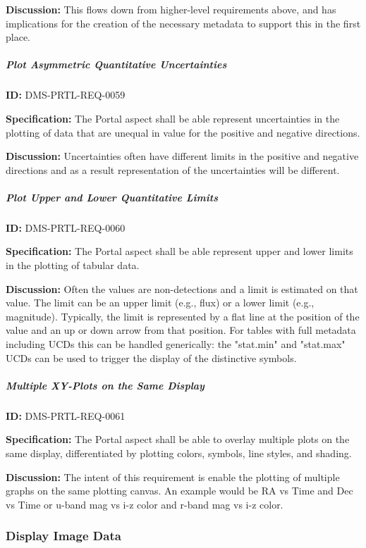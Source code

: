 \documentclass[SE,toc,lsstdraft]{lsstdoc}
\begin{document}
\textbf{Discussion:}
This flows down from higher-level requirements above, and has implications for the creation of the necessary metadata to support this in the first place.

\subparagraph{Plot Asymmetric Quantitative Uncertainties}\hfill  %

\label{DMS-PRTL-REQ-0059}
\textbf{ID:} DMS-PRTL-REQ-0059

\textbf{Specification:}
The Portal aspect shall be able represent uncertainties in the plotting of data that are unequal in value for the positive and negative directions.

\textbf{Discussion:}
Uncertainties often have different limits in the positive and negative directions and as a result representation of the uncertainties will be different.

\subparagraph{Plot Upper and Lower Quantitative Limits}\hfill  %

\label{DMS-PRTL-REQ-0060}
\textbf{ID:} DMS-PRTL-REQ-0060

\textbf{Specification:}
The Portal aspect shall be able represent upper and lower limits in the plotting of tabular data.

\textbf{Discussion:}
Often the values are non-detections and a limit is estimated on that value.  The limit can be an upper limit (e.g., flux) or a lower limit (e.g., magnitude).  Typically, the limit is represented by a flat line at the position of the value and an up or down arrow from that position.
For tables with full metadata including UCDs this can be handled generically: the "stat.min" and "stat.max" UCDs can be used to trigger the display of the distinctive symbols.

\subparagraph{Multiple XY-Plots on the Same Display}\hfill  %

\label{DMS-PRTL-REQ-0061}
\textbf{ID:} DMS-PRTL-REQ-0061

\textbf{Specification:}
The Portal aspect shall be able to overlay multiple plots on the same display, differentiated by plotting colors, symbols, line styles, and shading.

\textbf{Discussion:}
The intent of this requirement is enable the plotting of multiple graphs on the same plotting canvas.  An example would be RA vs Time and Dec vs Time or u-band mag vs i-z color and r-band mag vs i-z color.

\subsubsection{Display Image Data}
\end{document}
